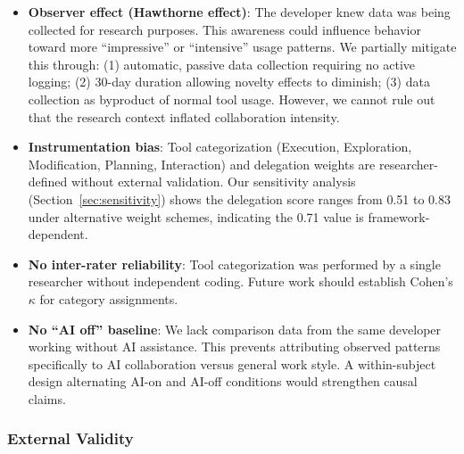 \begin{itemize}
    \item \textbf{Observer effect (Hawthorne effect)}: The developer knew data was being collected for research purposes. This awareness could influence behavior toward more ``impressive'' or ``intensive'' usage patterns. We partially mitigate this through: (1) automatic, passive data collection requiring no active logging; (2) 30-day duration allowing novelty effects to diminish; (3) data collection as byproduct of normal tool usage. However, we cannot rule out that the research context inflated collaboration intensity.

    \item \textbf{Instrumentation bias}: Tool categorization (Execution, Exploration, Modification, Planning, Interaction) and delegation weights are researcher-defined without external validation. Our sensitivity analysis (Section~\ref{sec:sensitivity}) shows the delegation score ranges from 0.51 to 0.83 under alternative weight schemes, indicating the 0.71 value is framework-dependent.

    \item \textbf{No inter-rater reliability}: Tool categorization was performed by a single researcher without independent coding. Future work should establish Cohen's $\kappa$ for category assignments.

    \item \textbf{No ``AI off'' baseline}: We lack comparison data from the same developer working without AI assistance. This prevents attributing observed patterns specifically to AI collaboration versus general work style. A within-subject design alternating AI-on and AI-off conditions would strengthen causal claims.
\end{itemize}

\subsubsection{External Validity}

